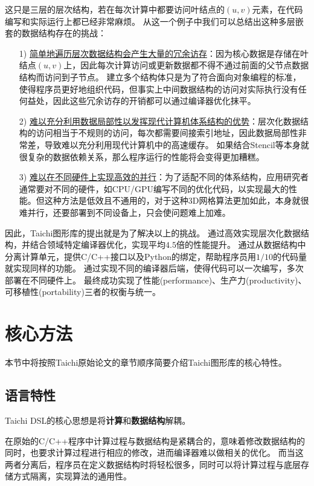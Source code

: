 \documentclass[thesis]{thesis}
\begin{document}
这只是三层的层次结构，若在每次计算中都要访问叶结点的$(u,v)$元素，在代码编写和实际运行上都已经非常麻烦。
从这一个例子中我们可以总结出这种多层嵌套的数据结构存在的挑战：
\begin{enumerate}
	\item[1)] \underline{简单地遍历层次数据结构会产生大量的冗余访存}：因为核心数据是存储在叶结点$(u,v)$上，因此每次计算访问或更新数据都不得不通过前面的父节点数据结构而访问到子节点。
	建立多个结构体只是为了符合面向对象编程的标准，使得程序员更好地组织代码，但事实上中间数据结构的访问对实际执行没有任何益处，因此这些冗余访存的开销都可以通过编译器优化抹平。
	\item[2)] \underline{难以充分利用数据局部性以发挥现代计算机体系结构的优势}：层次化数据结构的访问相当于不规则的访问，每次都需要间接索引地址，因此数据局部性非常差，导致难以充分利用现代计算机中的高速缓存。
	如果结合Stencil\cite{stencil}等本身就很复杂的数据依赖关系，那么程序运行的性能将会变得更加糟糕。
	\item[3)] \underline{难以在不同硬件上实现高效的并行}：为了适配不同的体系结构，应用研究者通常要对不同的硬件，如CPU/GPU编写不同的优化代码，以实现最大的性能。但这种方法是低效且不通用的，对于这种3D网格算法更加如此，本身就很难并行，还要部署到不同设备上，只会使问题难上加难。
\end{enumerate}

因此，Taichi图形库的提出就是为了解决以上的挑战。
通过高效实现层次化数据结构，并结合领域特定编译器优化，实现平均$4.5$倍的性能提升。
通过从数据结构中分离计算单元，提供C/C++接口以及Python的绑定，帮助程序员用$1/10$的代码量就实现同样的功能。
通过实现不同的编译器后端，使得代码可以一次编写，多次部署在不同硬件上。
最终成功实现了性能(performance)、生产力(productivity)、可移植性(portability)三者的权衡与统一。

\section{核心方法}
\label{sec:method}
本节中将按照Taichi原始论文\cite{hu_taichi_2019}的章节顺序简要介绍Taichi图形库的核心特性。

\subsection{语言特性}
Taichi DSL的核心思想是将\textbf{计算}和\textbf{数据结构}解耦。

在原始的C/C++程序中计算过程与数据结构是紧耦合的，意味着修改数据结构的同时，也要求计算过程进行相应的修改，进而编译器难以做相关的优化。
而当这两者分离后，程序员在定义数据结构时将轻松很多，同时可以将计算过程与底层存储方式隔离，实现算法的通用性。
\end{document}
